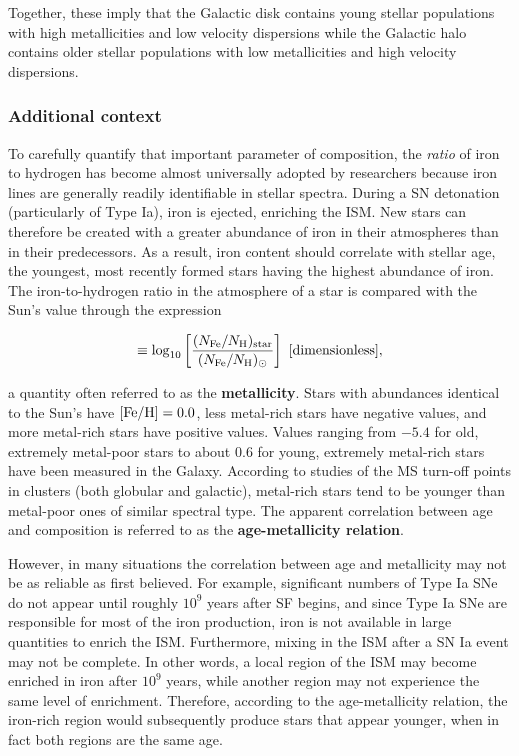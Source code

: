\documentclass[a4paper,10pt]{article}
\begin{document}
{\noindent}Together, these imply that the Galactic disk contains young stellar populations with high metallicities and low velocity dispersions while the Galactic halo contains older stellar populations with low metallicities and high velocity dispersions.

\subsubsection{Additional context}

{\noindent}To carefully quantify that important parameter of composition, the \textit{ratio} of iron to hydrogen has become almost universally adopted by researchers because iron lines are generally readily identifiable in stellar spectra. During a SN detonation (particularly of Type Ia), iron is ejected, enriching the ISM. New stars can therefore be created with a greater abundance of iron in their atmospheres than in their predecessors. As a result, iron content should correlate with stellar age, the youngest, most recently formed stars having the highest abundance of iron. The iron-to-hydrogen ratio in the atmosphere of a star is compared with the Sun's value through the expression

\begin{align*}
    [{\rm Fe/H}] \equiv \log_{10} \left[\frac{(N_{\rm Fe}/N_{\rm H})_{\rm star}}{(N_{\rm Fe}/N_{\rm H})_\odot}\right] ~ [{\rm dimensionless}],
\end{align*}

{\noindent}a quantity often referred to as the \textbf{metallicity}. Stars with abundances identical to the Sun's have $[{\rm Fe/H}]=0.0$, less metal-rich stars have negative values, and more metal-rich stars have positive values. Values ranging from $-5.4$ for old, extremely metal-poor stars to about $0.6$ for young, extremely metal-rich stars have been measured in the Galaxy. According to studies of the MS turn-off points in clusters (both globular and galactic), metal-rich stars tend to be younger than metal-poor ones of similar spectral type. The apparent correlation between age and composition is referred to as the \textbf{age-metallicity relation}.

{\noindent}However, in many situations the correlation between age and metallicity may not be as reliable as first believed. For example, significant numbers of Type Ia SNe do not appear until roughly $10^9$ years after SF begins, and since Type Ia SNe are responsible for most of the iron production, iron is not available in large quantities to enrich the ISM. Furthermore, mixing in the ISM after a SN Ia event may not be complete. In other words, a local region of the ISM may become enriched in iron after $10^9$ years, while another region may not experience the same level of enrichment. Therefore, according to the age-metallicity relation, the iron-rich region would subsequently produce stars that appear younger, when in fact both regions are the same age.
\end{document}
